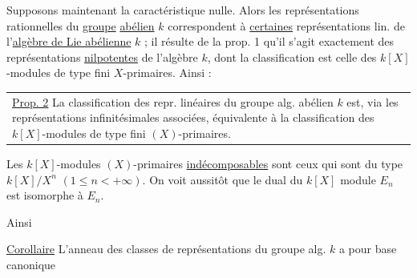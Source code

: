 
Supposons maintenant la caractéristique nulle. Alors les représentations  rationnelles du \uline{groupe} \uline{abélien} $k$ correspondent à \uline{certaines} représentations lin. de l'\uline{algèbre de Lie abélienne} $k$ ; il résulte de la  prop. 1 qu'il s'agit exactement des représentations \uline{nilpotentes} de l'algèbre $k$, dont la classification est celle des $k[X]$-modules de type fini $X$-primaires. Ainsi :

\noindent\begin{tabular}{@{}|p{.92\linewidth}@{}}\uline{Prop. 2} La classification des repr. linéaires du groupe alg. abélien $k$ est, via les représentations infinitésimales associées, équivalente à la classification des $k[X]$-modules de type fini $(X)$-primaires.\end{tabular}


Les $k[X]$-modules $(X)$-primaires \uline{indécomposables} sont ceux qui sont du type $k[X]/X^{n}$ $(1\leq n<+\infty)$. On  voit aussitôt que le dual  du $k[X]$ module $E_n$ est isomorphe à $E_n$.


Ainsi

\uline{Corollaire} L'anneau  des classes de représentations du groupe alg. $k$ a pour base canonique

